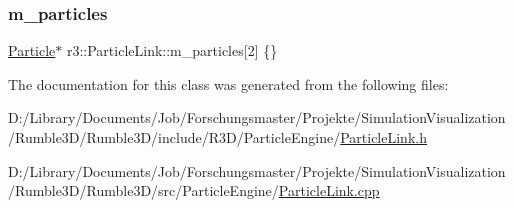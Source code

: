 \subsubsection{\texorpdfstring{m\+\_\+particles}{m\_particles}}
{\footnotesize\ttfamily \mbox{\hyperlink{classr3_1_1_particle}{Particle}}$\ast$ r3\+::\+Particle\+Link\+::m\+\_\+particles\mbox{[}2\mbox{]} \{\}\hspace{0.3cm}{\ttfamily [protected]}}



The documentation for this class was generated from the following files\+:\begin{DoxyCompactItemize}
\item 
D\+:/\+Library/\+Documents/\+Job/\+Forschungsmaster/\+Projekte/\+Simulation\+Visualization/\+Rumble3\+D/\+Rumble3\+D/include/\+R3\+D/\+Particle\+Engine/\mbox{\hyperlink{_particle_link_8h}{Particle\+Link.\+h}}\item 
D\+:/\+Library/\+Documents/\+Job/\+Forschungsmaster/\+Projekte/\+Simulation\+Visualization/\+Rumble3\+D/\+Rumble3\+D/src/\+Particle\+Engine/\mbox{\hyperlink{_particle_link_8cpp}{Particle\+Link.\+cpp}}\end{DoxyCompactItemize}
